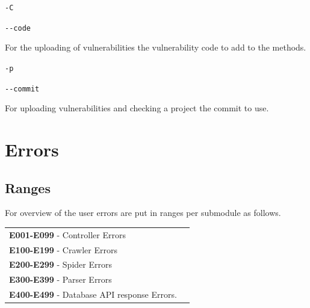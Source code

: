 \documentclass{article}
\begin{document}
\texttt{-C}\par
\texttt{-{}-code}\par
\begin{adjustwidth}{1cm}{}
For the uploading of vulnerabilities the vulnerability code to add to the methods. \\
\end{adjustwidth}

\texttt{-p}\par
\texttt{-{}-commit}\par
\begin{adjustwidth}{1cm}{}
For uploading vulnerabilities and checking a project the commit to use. \\
\end{adjustwidth}


\clearpage
\section{Errors}
\subsection{Ranges}
For overview of the user errors are put in ranges per submodule as follows.\\
\begin{tabularx}{\textwidth}{lX} 
    \textbf{E001-E099} - Controller Errors\\
    \textbf{E100-E199} - Crawler Errors\\
    \textbf{E200-E299} - Spider Errors\\
    \textbf{E300-E399} - Parser Errors\\
    \textbf{E400-E499} - Database API response Errors.\\
\end{tabularx}
\end{document}
